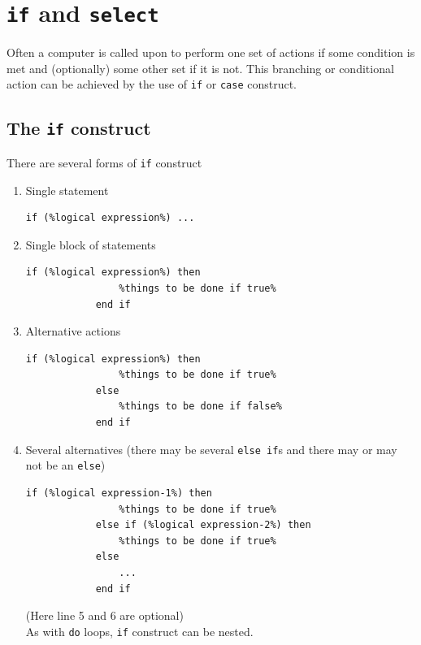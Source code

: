 \documentclass[12pt,oneside]{book}
\newcommand{\code}[1]{\lstinline[keywordstyle=\color{black},basicstyle=\ttfamily]{#1}}
\begin{document}
    \section{\code{if} and \code{select}}
    Often a computer is called upon to perform one set of actions if some condition is met and (optionally) some other set if it is not. This branching or conditional action can be achieved by the use of \code{if} or \code{case} construct.
    \subsection{The \code{if} construct}
    There are several forms of \code{if} construct
    \begin{enumerate}[label=(\roman*)]
        \item Single statement
        \begin{lstlisting}[numbers=none,escapechar=\%]
            if (%logical expression%) ...
        \end{lstlisting}
        \item Single block of statements
        \begin{lstlisting}[numbers=none,escapechar=\%]
            if (%logical expression%) then
                %things to be done if true%
            end if
        \end{lstlisting}
        \item Alternative actions
        \begin{lstlisting}[numbers=none,escapechar=\%]
            if (%logical expression%) then
                %things to be done if true%
            else
                %things to be done if false%
            end if
        \end{lstlisting}
        \item Several alternatives (there may be several \code{else if}s and there may or may not be an \code{else})
        \begin{lstlisting}[escapechar=\%]
            if (%logical expression-1%) then
                %things to be done if true%
            else if (%logical expression-2%) then
                %things to be done if true%
            else 
                ...
            end if
        \end{lstlisting}
        (Here line 5 and 6 are optional)\\
        As with \code{do} loops, \code{if} construct can be nested.
    \end{enumerate}
\end{document}
